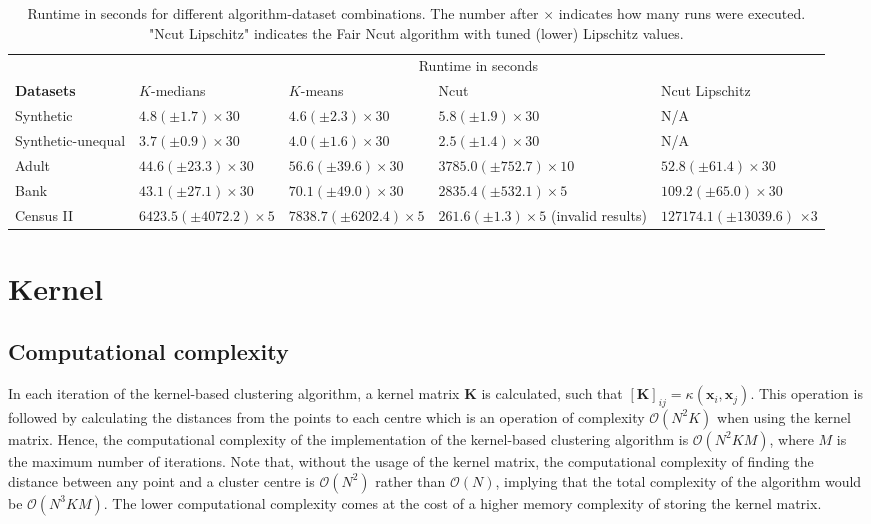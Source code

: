 \begin{table}[H]
	\small 
	\centering
	\begin{tabular}{|m{1.4cm}|m{2.4cm}|m{2.4cm}|m{2.4cm}|m{2.6cm}|}
			\hline
		& \multicolumn{4}{c|}{Runtime in seconds} \\
		\cline{2-5}
		\textbf{Datasets} & $K$-medians & $K$-means & Ncut & Ncut Lipschitz \\ 
		\cline{2-5}
		\hline
		Synthetic 			& $   4.8 (\pm   1.7) \times 30$ & $   4.6 (\pm   2.3) \times 30$ & $   5.8 (\pm  1.9) \times 30$ 					& N/A \\
		Synthetic-unequal 	& $   3.7 (\pm   0.9) \times 30$ & $   4.0 (\pm   1.6) \times 30$ & $   2.5 (\pm  1.4) \times 30$ 					& N/A \\
		Adult 				& $  44.6 (\pm  23.3) \times 30$ & $  56.6 (\pm  39.6) \times 30$ & $3785.0 (\pm752.7) \times 10$					& $    52.8 (\pm   61.4) \times 30$ \\
		Bank 				& $  43.1 (\pm  27.1) \times 30$ & $  70.1 (\pm  49.0) \times 30$ & $2835.4 (\pm532.1) \times  5$ 					& $   109.2 (\pm   65.0) \times 30$ \\
		Census II 			& $6423.5 (\pm4072.2) \times  5$ & $7838.7 (\pm6202.4) \times  5$ & $ 261.6 (\pm  1.3) \times  5$ (invalid results) & $127174.1 (\pm13039.6)$ $\times  3$ \\
		\hline
	\end{tabular}
	\caption{Runtime in seconds for different algorithm-dataset combinations. The number after $\times$ indicates how many runs were executed. "Ncut Lipschitz" indicates the Fair Ncut algorithm with tuned (lower) Lipschitz values.}
	\label{tab:runtime}
\end{table}






\section{Kernel}\label{appendix:kernel}

\subsection{Computational complexity}
In each iteration of the kernel-based clustering algorithm, a kernel matrix $\mathbf{K}$ is calculated, such that $[\mathbf{K}]_{ij} = \kappa(\textbf{x}_i, \textbf{x}_j)$. This operation is followed by calculating the distances from the points to each centre which is an operation of complexity  $\mathcal{O}(N^2K)$ when using the kernel matrix. Hence, the computational complexity of the implementation of the kernel-based clustering algorithm is $\mathcal{O}(N^2KM)$, where $M$ is the maximum number of iterations. Note that, without the usage of the kernel matrix, the computational complexity of finding the distance between any point and a cluster centre is $\mathcal{O}(N^2)$ rather than $\mathcal{O}(N)$, implying that the total complexity of the algorithm would be $\mathcal{O}(N^3KM).$ The lower computational complexity comes at the cost of a higher memory complexity of storing the kernel matrix.


